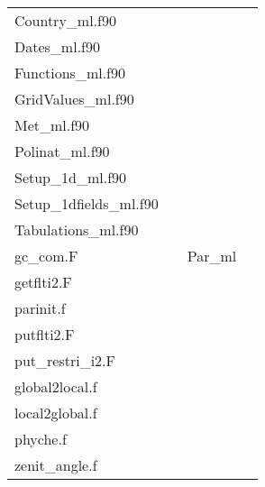 \begin{small}
\begin{table}
\begin{tabular}{|llll|}
Country\_ml.f90 &  &   &  \\
Dates\_ml.f90 &  &   &  \\
Functions\_ml.f90 &  &   &  \\
GridValues\_ml.f90 &  &   &  \\
Met\_ml.f90 &  &   &  \\
Polinat\_ml.f90 &  &   &  \\
Setup\_1d\_ml.f90 &  &   &  \\
Setup\_1dfields\_ml.f90 &  &   &  \\
Tabulations\_ml.f90 &  &   &  \\
\hline
gc\_com.F &  & Par\_ml   &  \\
getflti2.F &  &   &  \\
parinit.f &  &   &  \\
putflti2.F &  &   &  \\
put\_restri\_i2.F &  &   &  \\
\hline
global2local.f &  &   &  \\
local2global.f &  &   &  \\
phyche.f &  &   &  \\
zenit\_angle.f &  &   &  \\
\hline
\end{tabular}
\end{table}
\end{small}

